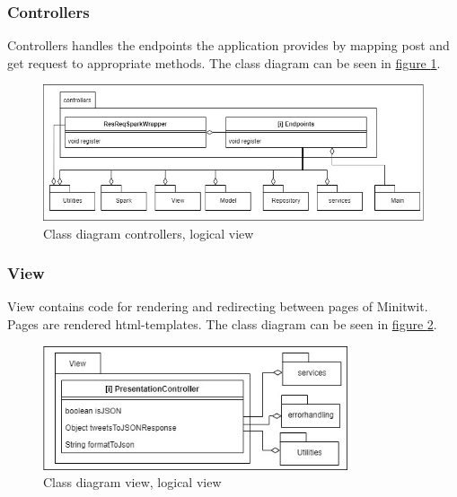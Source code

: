 \subsubsection{Controllers}
Controllers handles the endpoints the application provides by mapping post and get request to appropriate methods. The class diagram can be seen in \hyperref[fig:classDiagramControllers]{figure \ref{fig:classDiagramControllers}}.
\begin{figure}[H]
    \centering
    \includegraphics[width=1.0\textwidth]{images/class_diagram_controllers.jpg}
    \caption{Class diagram controllers, logical view}
    \label{fig:classDiagramControllers}
\end{figure}

\subsubsection{View}
View contains code for rendering and redirecting between pages of Minitwit. Pages are rendered html-templates. The class diagram can be seen in \hyperref[fig:classDiagramView]{figure \ref{fig:classDiagramView}}.
\begin{figure}[H]
    \centering
    \includegraphics[width=0.8\textwidth]{images/class_diagram_view.jpg}
    \caption{Class diagram view, logical view}
    \label{fig:classDiagramView}
\end{figure}

